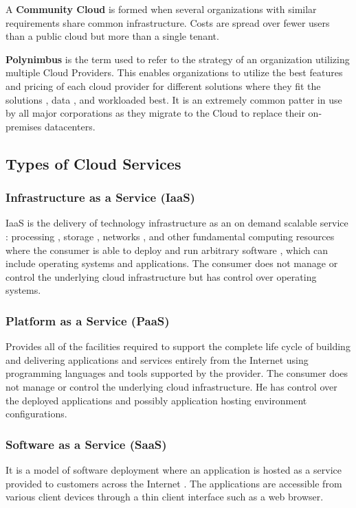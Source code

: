 \documentclass{article}
\begin{document}
A \textbf{Community Cloud} is formed when several organizations with similar requirements share common infrastructure.
Costs are spread over fewer users than a public cloud but more than a single tenant.

\textbf{Polynimbus} is the term used to refer to the strategy of an organization utilizing multiple Cloud Providers.
This enables organizations to utilize the best features and pricing of each cloud provider for different solutions where they fit the solutions , data , and workloaded best.
It is an extremely common patter in use by all major corporations as they migrate to the Cloud to replace their on-premises datacenters.

\subsection{Types of Cloud Services}
\subsubsection{Infrastructure as a Service (IaaS)}
IaaS is the delivery of technology infrastructure as an on demand scalable service : processing , storage , networks , and other fundamental computing resources where the consumer is able to deploy and run arbitrary software , which can include operating systems and applications.
The consumer does not manage or control the underlying cloud infrastructure but has control over operating systems.

\subsubsection{Platform as a Service (PaaS)}
Provides all of the facilities required to support the complete life cycle of building and delivering applications and services entirely from the Internet using programming languages and tools supported by the provider.
The consumer does not manage or control the underlying cloud infrastructure.
He has control over the deployed applications and possibly application hosting environment configurations.

\subsubsection{Software as a Service (SaaS)}
It is a model of software deployment where an application is hosted as a service provided to customers across the Internet . The applications are accessible from various client devices through a thin client interface such as a web browser.
\end{document}
